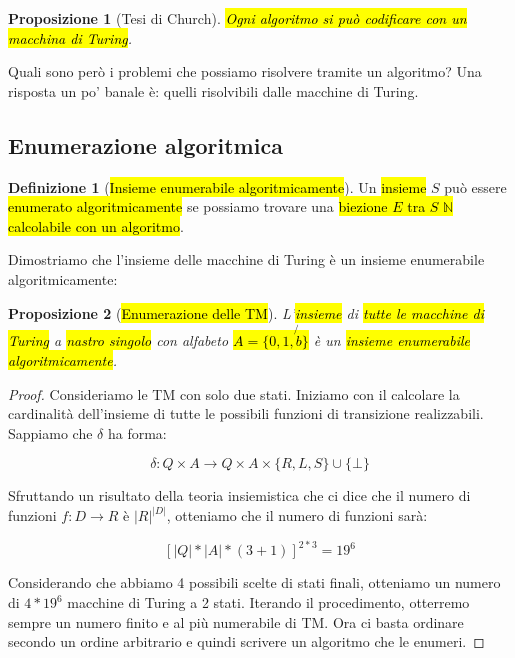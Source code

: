 \documentclass[a4paper,11pt,twoside]{article}
\theoremstyle{plain}
\newtheorem{prop}{Proposizione}[section]
\theoremstyle{definition}
\newtheorem{defn}{Definizione}[section]
\theoremstyle{remark}
\begin{document}
\begin{prop}[Tesi di Church]\label{thm:tesi-church-2}
  \hl{Ogni algoritmo si può codificare con un macchina di Turing}.
\end{prop}

Quali sono però i problemi che possiamo risolvere tramite un algoritmo? Una
risposta un po' banale è: quelli risolvibili dalle macchine di Turing.

\subsection{Enumerazione algoritmica}\label{sec:enum-alg}

\begin{defn}[\hl{Insieme enumerabile algoritmicamente}]\label{def:enum-alg}
  Un \hl{insieme} $S$ può essere \hl{enumerato algoritmicamente} se possiamo
  trovare una \hl{biezione $E$ tra $S$ $\mathbb{N}$ calcolabile con un
  algoritmo}.
\end{defn}

Dimostriamo che l'insieme delle macchine di Turing è un insieme enumerabile
algoritmicamente:

\begin{prop}[\hl{Enumerazione delle TM}]\label{thm:enum-alg-TM}
  L'\hl{insieme} di \hl{tutte le macchine di Turing} a \hl{nastro singolo} con
  alfabeto \hl{$A = \{ 0,1,\not{b}\}$} è un \hl{insieme enumerabile
  algoritmicamente}.
\end{prop}
\begin{proof}
  Consideriamo le TM con solo due stati. Iniziamo con il calcolare la
  cardinalità dell'insieme di tutte le possibili funzioni di transizione
  realizzabili. Sappiamo che $\delta$ ha forma:

  \[
    \delta : Q \times A \to Q \times A \times \{R,L,S\} \cup \{\bot\}
  \]

  Sfruttando un risultato della teoria insiemistica che ci dice che il numero di
  funzioni $f: D \to R$ è $|R|^{|D|}$, otteniamo che il numero di funzioni sarà:

  \[
    {[|Q|*|A|*(3+1)]}^{2*3} = 19^6
  \]

  Considerando che abbiamo 4 possibili scelte di stati finali, otteniamo un
  numero di $4*19^6$ macchine di Turing a 2 stati. Iterando il procedimento,
  otterremo sempre un numero finito e al più numerabile di TM\@. Ora ci basta
  ordinare secondo un ordine arbitrario e quindi scrivere un algoritmo che le
  enumeri.
\end{proof}
\end{document}
